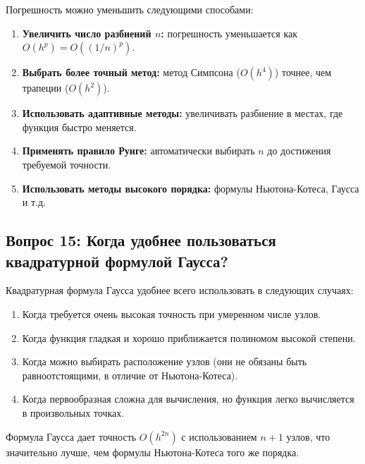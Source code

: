 \documentclass[a4paper,12pt]{article}
\begin{document}
Погрешность можно уменьшить следующими способами:
\begin{enumerate}
    \item \textbf{Увеличить число разбиений $n$:} погрешность уменьшается как $O(h^p) = O((1/n)^p)$.
    \item \textbf{Выбрать более точный метод:} метод Симпсона ($O(h^4)$) точнее, чем трапеции ($O(h^2)$).
    \item \textbf{Использовать адаптивные методы:} увеличивать разбиение в местах, где функция быстро меняется.
    \item \textbf{Применять правило Рунге:} автоматически выбирать $n$ до достижения требуемой точности.
    \item \textbf{Использовать методы высокого порядка:} формулы Ньютона-Котеса, Гаусса и т.д.
\end{enumerate}

\subsection*{Вопрос 15: Когда удобнее пользоваться квадратурной формулой Гаусса?}

Квадратурная формула Гаусса удобнее всего использовать в следующих случаях:
\begin{enumerate}
    \item Когда требуется очень высокая точность при умеренном числе узлов.
    \item Когда функция гладкая и хорошо приближается полиномом высокой степени.
    \item Когда можно выбирать расположение узлов (они не обязаны быть равноотстоящими, в отличие от Ньютона-Котеса).
    \item Когда первообразная сложна для вычисления, но функция легко вычисляется в произвольных точках.
\end{enumerate}

Формула Гаусса дает точность $O(h^{2n})$ с использованием $n+1$ узлов, что значительно лучше, чем формулы Ньютона-Котеса того же порядка.
\end{document}
